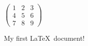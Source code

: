 \documentclass{article}
\begin{document}
$\begin{pmatrix}
    1 & 2 & 3 \\
    4 & 5 & 6 \\
    7 & 8 & 9
\end{pmatrix}$

My first \LaTeX~document!
\end{document}
